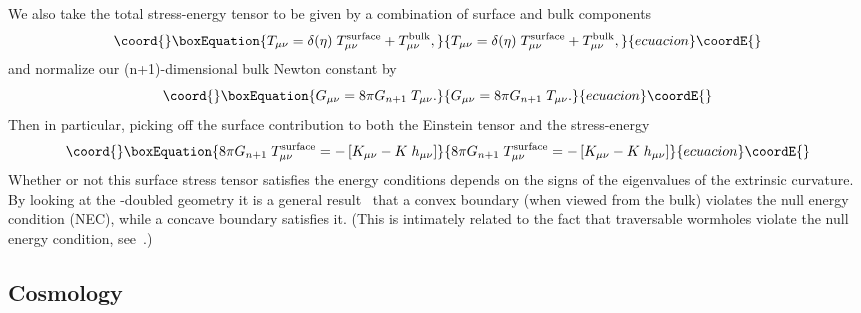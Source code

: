 \documentclass[a4paper,12pt]{article}
\begin{document}
We also take the total stress-energy tensor to be given by a
combination of surface and bulk components
%
\begin{equation}\coord{}\boxEquation{
T_{\mu\nu} = \delta(\eta) \;  T^\surface_{\mu\nu} + T^\bulk_{\mu\nu},
}{
T_{\mu\nu} = \delta(\eta) \;  T^\surface_{\mu\nu} + T^\bulk_{\mu\nu},
}{ecuacion}\coordE{}\end{equation}
%
and normalize our (n+1)-dimensional bulk Newton constant \coordHE{} by
%
\begin{equation}\coord{}\boxEquation{
G_{\mu\nu} = 8\pi G_{n+1} \; T_{\mu\nu}.
}{
G_{\mu\nu} = 8\pi G_{n+1} \; T_{\mu\nu}.
}{ecuacion}\coordE{}\end{equation}
%
Then in particular, picking off the surface contribution to both the
Einstein tensor and the stress-energy
%
\begin{equation}\coord{}\boxEquation{
8 \pi G_{n+1} \; T^\surface_{\mu\nu} 
= - \left[ K_{\mu\nu} - K \; h_{\mu\nu} \right]
}{
8 \pi G_{n+1} \; T^\surface_{\mu\nu} 
= - \left[ K_{\mu\nu} - K \; h_{\mu\nu} \right]
}{ecuacion}\coordE{}\end{equation}
%
Whether or not this surface stress tensor satisfies the energy
conditions depends on the signs of the eigenvalues of the extrinsic
curvature. By looking at the \coordHE{}-doubled geometry it is a general
result~\cite{Book} that a convex boundary (when viewed from the bulk)
violates the null energy condition (NEC), while a concave boundary
satisfies it. (This is intimately related to the fact that traversable
wormholes violate the null energy condition,
see~\cite{Book,Surgery,Morris-Thorne,Hochberg,Survey,Examples}.)


\subsection{Cosmology}
\end{document}
